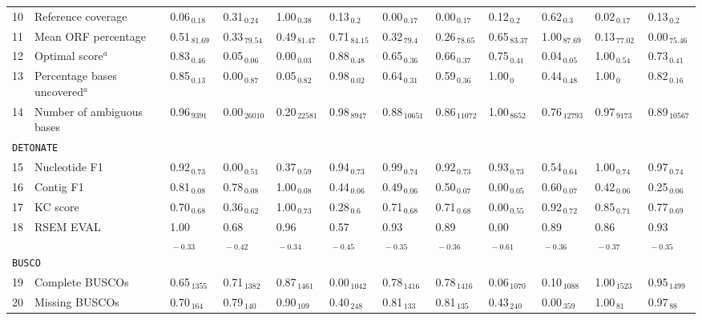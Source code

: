 \documentclass{scrartcl}
\begin{document}
\begin{landscape}
\begin{table}
\begin{scriptsize}
\begin{tabular}{llllllllllll}
10 & Reference coverage  & 0.06$_{\,0.18}$ & 0.31$_{\,0.24}$ & 1.00$_{\,0.38}$ & 0.13$_{\,0.2}$ & 0.00$_{\,0.17}$ & 0.00$_{\,0.17}$ & 0.12$_{\,0.2}$ & 0.62$_{\,0.3}$ & 0.02$_{\,0.17}$ & 0.13$_{\,0.2}$ \\11 & Mean ORF percentage  & 0.51$_{\,81.69}$ & 0.33$_{\,79.54}$ & 0.49$_{\,81.47}$ & 0.71$_{\,84.15}$ & 0.32$_{\,79.4}$ & 0.26$_{\,78.65}$ & 0.65$_{\,83.37}$ & 1.00$_{\,87.69}$ & 0.13$_{\,77.02}$ & 0.00$_{\,75.46}$ \\12 & Optimal score$^{a}$  & 0.83$_{\,0.46}$ & 0.05$_{\,0.06}$ & 0.00$_{\,0.03}$ & 0.88$_{\,0.48}$ & 0.65$_{\,0.36}$ & 0.66$_{\,0.37}$ & 0.75$_{\,0.41}$ & 0.04$_{\,0.05}$ & 1.00$_{\,0.54}$ & 0.73$_{\,0.41}$ \\13 & Percentage bases uncovered$^{a}$  & 0.85$_{\,0.13}$ & 0.00$_{\,0.87}$ & 0.05$_{\,0.82}$ & 0.98$_{\,0.02}$ & 0.64$_{\,0.31}$ & 0.59$_{\,0.36}$ & 1.00$_{\,0}$ & 0.44$_{\,0.48}$ & 1.00$_{\,0}$ & 0.82$_{\,0.16}$ \\14 & Number of ambiguous bases  & 0.96$_{\,9391}$ & 0.00$_{\,26010}$ & 0.20$_{\,22581}$ & 0.98$_{\,8947}$ & 0.88$_{\,10651}$ & 0.86$_{\,11072}$ & 1.00$_{\,8652}$ & 0.76$_{\,12793}$ & 0.97$_{\,9173}$ & 0.89$_{\,10567}$ \\\midrule
\multicolumn{11}{l}{\texttt{DETONATE}}\\ 
\midrule
15 & Nucleotide F1  & 0.92$_{\,0.73}$ & 0.00$_{\,0.51}$ & 0.37$_{\,0.59}$ & 0.94$_{\,0.73}$ & 0.99$_{\,0.74}$ & 0.92$_{\,0.73}$ & 0.93$_{\,0.73}$ & 0.54$_{\,0.64}$ & 1.00$_{\,0.74}$ & 0.97$_{\,0.74}$ \\16 & Contig F1  & 0.81$_{\,0.08}$ & 0.78$_{\,0.08}$ & 1.00$_{\,0.08}$ & 0.44$_{\,0.06}$ & 0.49$_{\,0.06}$ & 0.50$_{\,0.07}$ & 0.00$_{\,0.05}$ & 0.60$_{\,0.07}$ & 0.42$_{\,0.06}$ & 0.25$_{\,0.06}$ \\17 & KC score  & 0.70$_{\,0.68}$ & 0.36$_{\,0.62}$ & 1.00$_{\,0.73}$ & 0.28$_{\,0.6}$ & 0.71$_{\,0.68}$ & 0.71$_{\,0.68}$ & 0.00$_{\,0.55}$ & 0.92$_{\,0.72}$ & 0.85$_{\,0.71}$ & 0.77$_{\,0.69}$ \\18 & RSEM EVAL  & 1.00$_{\,-0.33}$ & 0.68$_{\,-0.42}$ & 0.96$_{\,-0.34}$ & 0.57$_{\,-0.45}$ & 0.93$_{\,-0.35}$ & 0.89$_{\,-0.36}$ & 0.00$_{\,-0.61}$ & 0.89$_{\,-0.36}$ & 0.86$_{\,-0.37}$ & 0.93$_{\,-0.35}$ \\\midrule
\multicolumn{11}{l}{\texttt{BUSCO}}\\ 
\midrule
19 & Complete BUSCOs  & 0.65$_{\,1355}$ & 0.71$_{\,1382}$ & 0.87$_{\,1461}$ & 0.00$_{\,1042}$ & 0.78$_{\,1416}$ & 0.78$_{\,1416}$ & 0.06$_{\,1070}$ & 0.10$_{\,1088}$ & 1.00$_{\,1523}$ & 0.95$_{\,1499}$ \\20 & Missing BUSCOs  & 0.70$_{\,164}$ & 0.79$_{\,140}$ & 0.90$_{\,109}$ & 0.40$_{\,248}$ & 0.81$_{\,133}$ & 0.81$_{\,135}$ & 0.43$_{\,240}$ & 0.00$_{\,359}$ & 1.00$_{\,81}$ & 0.97$_{\,88}$ \\\midrule

\end{tabular}
\end{scriptsize}
\end{table}
\end{landscape}
\end{document}
